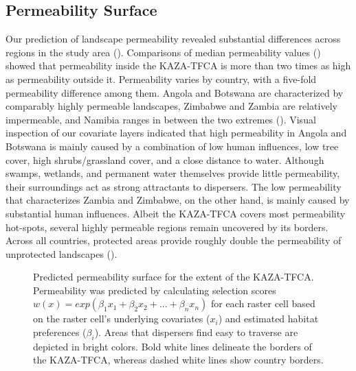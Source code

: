 \documentclass[abstract=on,10pt,a4paper,bibliography=totocnumbered]{article}
\begin{document}
\subsection{Permeability Surface}
Our prediction of landscape permeability revealed substantial differences across
regions in the study area (). Comparisons of median
permeability values () showed that permeability inside
the KAZA-TFCA is more than two times as high as permeability outside it.
Permeability varies by country, with a five-fold permeability difference among
them. Angola and Botswana are characterized by comparably highly permeable
landscapes, Zimbabwe and Zambia are relatively impermeable, and Namibia ranges
in between the two extremes (). Visual inspection of our
covariate layers indicated that high permeability in Angola and Botswana is
mainly caused by a combination of low human influences, low tree cover, high
shrubs/grassland cover, and a close distance to water. Although swamps,
wetlands, and permanent water themselves provide little permeability, their
surroundings act as strong attractants to dispersers. The low permeability that
characterizes Zambia and Zimbabwe, on the other hand, is mainly caused by
substantial human influences. Albeit the KAZA-TFCA covers most permeability
hot-spots, several highly permeable regions remain uncovered by its borders.
Across all countries, protected areas provide roughly double the permeability of
unprotected landscapes ().

\begin{figure}[hbtp]
  \begin{center}
    \caption{Predicted permeability surface for the extent of the KAZA-TFCA.
    Permeability was predicted by calculating selection scores \(w(x) =
    exp(\beta_1 x_1 + \beta_2 x_2 + ... + \beta_n x_n)\) for each raster cell
    based on the raster cell's underlying covariates (\(x_i\)) and estimated
    habitat preferences (\(\beta_i\)). Areas that dispersers find easy to
    traverse are depicted in bright colors. Bold white lines delineate the
    borders of the KAZA-TFCA, whereas dashed white lines show country borders.}
    \label{PermeabilityMap}
  \end{center}
\end{figure}
\end{document}
